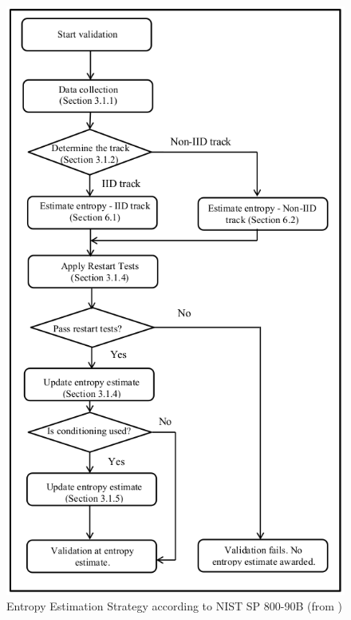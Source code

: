 \begin{figure}[H]
	\label{fig:entropy-est-strategy}
	\centering
	\includegraphics[scale=0.6]{img/nsp800-90b-entropy-est-strategy.png}
	\caption{Entropy Estimation Strategy according to NIST SP 800-90B (from \cite{turan2018nist})}
\end{figure}




